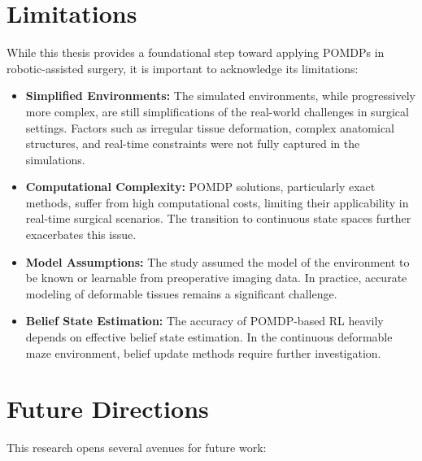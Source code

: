 \section{Limitations}

While this thesis provides a foundational step toward applying POMDPs in robotic-assisted surgery, it is important to acknowledge its limitations:

\begin{itemize}
    \item \textbf{Simplified Environments:} The simulated environments, while progressively more complex, are still simplifications of the real-world challenges in surgical settings. Factors such as irregular tissue deformation, complex anatomical structures, and real-time constraints were not fully captured in the simulations.
    \item \textbf{Computational Complexity:} POMDP solutions, particularly exact methods, suffer from high computational costs, limiting their applicability in real-time surgical scenarios. The transition to continuous state spaces further exacerbates this issue.
    \item \textbf{Model Assumptions:} The study assumed the model of the environment to be known or learnable from preoperative imaging data. In practice, accurate modeling of deformable tissues remains a significant challenge.
    \item \textbf{Belief State Estimation:} The accuracy of POMDP-based RL heavily depends on effective belief state estimation. In the continuous deformable maze environment, belief update methods require further investigation.
\end{itemize}

\section{Future Directions}

This research opens several avenues for future work:

